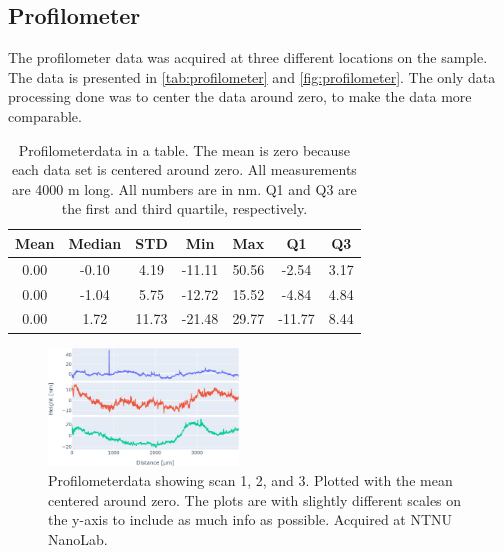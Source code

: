 \subsection{Profilometer}
\label{results:profilometer}

The profilometer data was acquired at three different locations on the sample.
The data is presented in \autoref{tab:profilometer} and \autoref{fig:profilometer}.
The only data processing done was to center the data around zero, to make the data more comparable.

\begin{table}[ht]
    \centering
    \caption{
        Profilometerdata in a table.
        The mean is zero because each data set is centered around zero.
        All measurements are 4000 \textmu m long.
        All numbers are in nm.
        Q1 and Q3 are the first and third quartile, respectively.
    }
    \begin{tabular}{ccccccc}
        Mean & Median & STD   & Min    & Max   & Q1     & Q3   \\
        \hline
        0.00 & -0.10  & 4.19  & -11.11 & 50.56 & -2.54  & 3.17 \\
        0.00 & -1.04  & 5.75  & -12.72 & 15.52 & -4.84  & 4.84 \\
        0.00 & 1.72   & 11.73 & -21.48 & 29.77 & -11.77 & 8.44 \\
    \end{tabular}
    \label{tab:profilometer}
\end{table}



\begin{figure}[ht]
    \centering
    \includegraphics[width=0.45\textwidth]{figures/profilometer_graph.jpg}
    \caption{Profilometerdata showing scan 1, 2, and 3.
        Plotted with the mean centered around zero.
        The plots are with slightly different scales on the y-axis to include as much info as possible.
        Acquired at NTNU NanoLab.
    }
    \label{fig:profilometer}
\end{figure}



